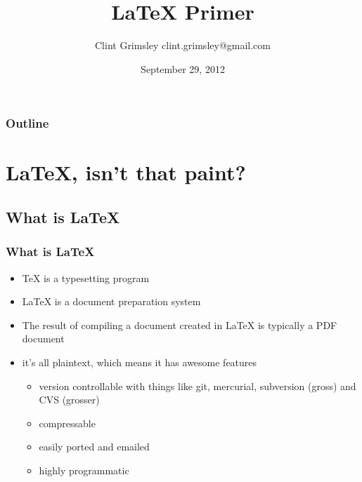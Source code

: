 \documentclass{beamer}
\title{LaTeX Primer}
\author{Clint Grimsley clint.grimsley@gmail.com}
\date{September 29, 2012}
\begin{document}
\begin{frame}
\titlepage
\end{frame}

\begin{frame}
  \frametitle{Outline}
    \tableofcontents
\end{frame}

\section{LaTeX, isn't that paint?}
\subsection{What is LaTeX}

\begin{frame}
\frametitle{What is LaTeX}
\begin{itemize}
  \item TeX is a typesetting program
  \item LaTeX is a document preparation system
  \item The result of compiling a document created in LaTeX is typically a PDF document
  \item it's all plaintext, which means it has awesome features
    \begin{itemize}
      \item version controllable with things like git, mercurial, subversion (gross) and CVS (grosser)
      \item compressable
      \item easily ported and emailed
      \item highly programmatic
    \end{itemize}
\end{itemize}
\end{frame}
\end{document}
